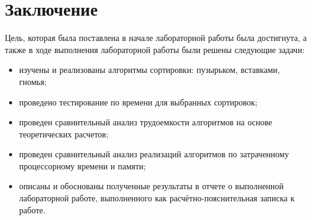 \chapter*{Заключение}

Цель, которая была поставлена в начале лабораторной работы была достигнута, а также в ходе выполнения лабораторной работы были решены следующие задачи:

\begin{itemize}
	\item изучены и реализованы алгоритмы сортировки: пузырьком, вставками, гномья;
    \item проведено тестирование по времени для выбранных сортировок;
    \item проведен сравнительный анализ трудоемкости алгоритмов на основе теоретических расчетов;
    \item проведен сравнительный анализ реализаций алгоритмов по затраченному процессорному времени и памяти;
	\item описаны и обоснованы полученные результаты в отчете о выполненной лабораторной работе, выполненного как расчётно-пояснительная записка к работе.
\end{itemize}